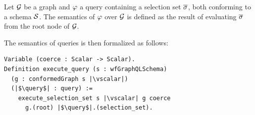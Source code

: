 
\begin{definition}
Let $\mathcal{G}$ be a graph and $\varphi$ a query containing a selection set $\overline{\sigma}$, both conforming to a schema $\mathcal{S}$. The semantics of $\varphi$ over $\mathcal{G}$  is defined as the result of evaluating $\overline{\sigma}$ from the root node of $\mathcal{G}$.
\end{definition}

The semantics of queries is then formalized as follows:
\begin{verbatim}
Variable (coerce : Scalar -> Scalar).
Definition execute_query (s : wfGraphQLSchema)
  (g : conformedGraph s |\vscalar|)
  (|$\query$| : query) :=
    execute_selection_set s |\vscalar| g coerce
      g.(root) |$\query$|.(selection_set).
\end{verbatim}







